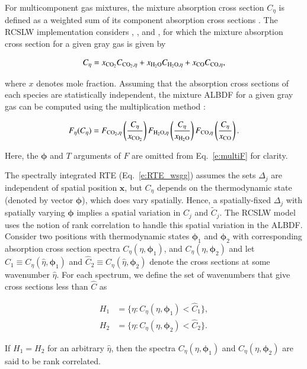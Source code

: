 \documentclass[preprint,12pt]{elsarticle}
\newcommand{\BS}{\boldsymbol}
\begin{document}
    For multicomponent gas mixtures, the mixture absorption cross section $C_{\eta}$ is defined as a weighted sum of its component absorption cross sections \cite{Solovjov_2000}. The RCSLW implementation considers , , and , for which the mixture absorption cross section for a given gray gas is given by
%
    \begin{linenomath}
        \begin{equation}
            \label{e:multiC}
            C_{\eta} = x_{\ce{CO2}}C_{\ce{CO2},\eta} + x_{\ce{H2O}}C_{\ce{H2O},\eta} + x_{\ce{CO}}C_{\ce{CO},\eta},
        \end{equation}
    \end{linenomath}
%
    where $x$ denotes mole fraction.
    Assuming that the absorption cross sections of each species are statistically independent, the mixture ALBDF for a given gray gas can be computed using the multiplication method \cite{Solovjov_2000}:
%
    \begin{linenomath}
        \begin{equation}
            \label{e:multiF}
            F_{\eta}(C_{\eta}) = F_{\ce{CO2},\eta} \left( \frac{C_{\eta}}{x_{\ce{CO2}}} \right) F_{\ce{H2O},\eta} \left( \frac{C_{\eta}}{x_{\ce{H2O}}} \right) F_{\ce{CO},\eta} \left( \frac{C_{\eta}}{x_{\ce{CO}}} \right).
        \end{equation}
    \end{linenomath}
%
    Here, the $\BS{\phi}$ and $T$ arguments of $F$ are omitted from Eq.~\ref{e:multiF} for clarity.

    The spectrally integrated RTE (Eq.~\ref{e:RTE_wsgg}) assumes the sets $\Delta_j$ are independent of spatial position $\mathbf{x}$, but $C_\eta$ depends on the thermodynamic state (denoted by vector $\BS{\phi}$), which does vary spatially.
    Hence, a spatially-fixed $\Delta_j$ with spatially varying $\BS{\phi}$ implies a spatial variation in $C_j$ and $\tilde{C}_j$.
    The RCSLW model uses the notion of rank correlation to handle this spatial variation in the ALBDF.
    Consider two positions with thermodynamic states $\BS{\phi}_1$ and $\BS{\phi}_2$ with corresponding absorption cross section spectra $C_\eta(\eta,\BS{\phi}_1)$, and $C_\eta(\eta,\BS{\phi}_2)$ and let $\hat{C}_1\equiv C_\eta(\hat{\eta},\BS{\phi}_1)$ and $\hat{C}_2\equiv C_\eta(\hat{\eta},\BS{\phi}_2)$ denote the cross sections at some wavenumber $\hat{\eta}$. For each spectrum, we define the set of wavenumbers that give cross sections less than $\hat{C}$ as
%
    \begin{linenomath}
        \begin{align}
            H_1&=\{\eta: C_\eta(\eta,\BS{\phi}_1)<\hat{C}_1\}, \\
            H_2&=\{\eta: C_\eta(\eta,\BS{\phi}_2)<\hat{C}_2\}.
        \end{align}
    \end{linenomath}
%
    If $H_1=H_2$ for an arbitrary $\hat{\eta}$, then the spectra $C_\eta(\eta,\BS{\phi}_1)$ and $C_\eta(\eta,\BS{\phi}_2)$ are said to be rank correlated.
\end{document}

